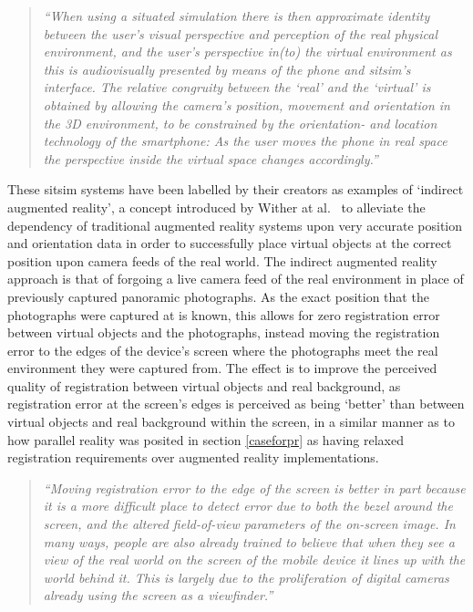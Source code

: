 \begin{quote}
	\textit{``When using a situated simulation there is then approximate identity between the user’s visual perspective and perception of the real physical environment, and the user’s perspective in(to) the virtual environment as this is audiovisually presented by means of the phone and sitsim’s interface. The relative congruity between the `real' and the `virtual' is obtained by allowing the camera’s position, movement and orientation in the 3D environment, to be constrained by the orientation- and location technology of the smartphone: As the user moves the phone in real space the perspective inside the virtual space changes accordingly.''}~\cite{Liestøl2011}
\end{quote}

These sitsim systems have been labelled by their creators as examples of `indirect augmented reality', a concept introduced by Wither at al.~\cite{Wither2011} to alleviate the dependency of traditional augmented reality systems upon very accurate position and orientation data in order to successfully place virtual objects at the correct position upon camera feeds of the real world. The indirect augmented reality approach is that of forgoing a live camera feed of the real environment in place of previously captured panoramic photographs. As the exact position that the photographs were captured at is known, this allows for zero registration error between virtual objects and the photographs, instead moving the registration error to the edges of the device's screen where the photographs meet the real environment they were captured from. The effect is to improve the perceived quality of registration between virtual objects and real background, as registration error at the screen's edges is perceived as being `better' than between virtual objects and real background within the screen, in a similar manner as to how parallel reality was posited in section \ref{caseforpr} as having relaxed registration requirements over augmented reality implementations.

\begin{quote}
	\textit{``Moving registration error to the edge of the screen is better in part because it is a more difficult place to detect error due to both the bezel around the screen, and the altered field-of-view parameters of the on-screen image. In many ways, people are also already trained to believe that when they see a view of the real world on the screen of the mobile device it lines up with the world behind it. This is largely due to the proliferation of digital cameras already using the screen as a viewfinder.''}~\cite{Wither2011}
\end{quote}

